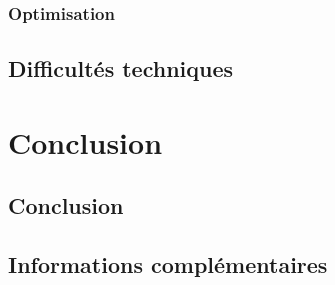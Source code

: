 \documentclass[a4paper,10pt]{report}
\begin{document}
\subsection{Optimisation}

\section{Difficultés techniques}

\chapter{Conclusion}
\section{Conclusion}


\section{Informations complémentaires}
\end{document}
